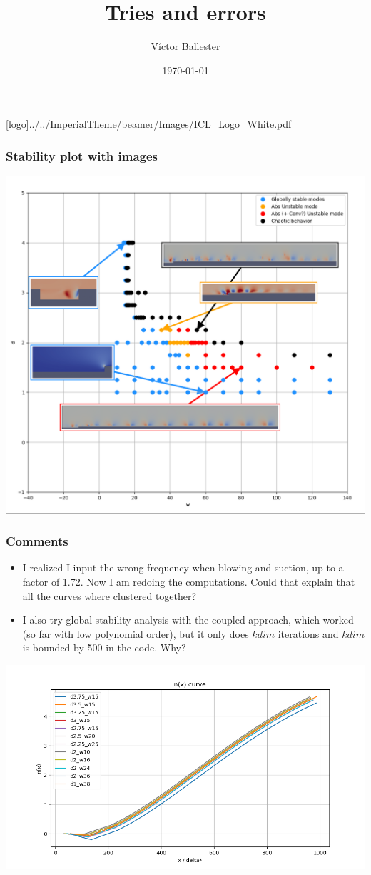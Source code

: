 \documentclass[
  aspectratio=169, %
  t, %
  onlytextwidth, %
  10pt, %
]{beamer}
\title{Tries and errors} %
\subtitle{} %
\author{Víctor Ballester} %
\date{\today} %
\def\imagefolder{../../ImperialTheme/beamer/Images}
\begin{document}
\begingroup
{} %
[logo]{\imagefolder/ICL_Logo_White.pdf} %
\frame[plain, s]{\titlepage} %
\endgroup

\begin{frame}
	\frametitle{Stability plot with images}
	\centering
	\includegraphics[width=0.5\linewidth]{Images/stabilitycurve.png}
\end{frame}

\begin{frame}
	\frametitle{Comments}
	\begin{itemize}
	  \item I realized I input the wrong frequency when blowing and suction, up to a factor of 1.72. Now I am redoing the computations. Could that explain that all the curves where clustered together?
	  \item I also try global stability analysis with the coupled approach, which worked (so far with low polynomial order), but it only does $kdim$ iterations and $kdim$ is bounded by 500 in the code. Why?
	\end{itemize}	
	\centering
	\includegraphics[width=0.5\linewidth]{Images/nfactorCurve.png}
\end{frame}
\end{document}

